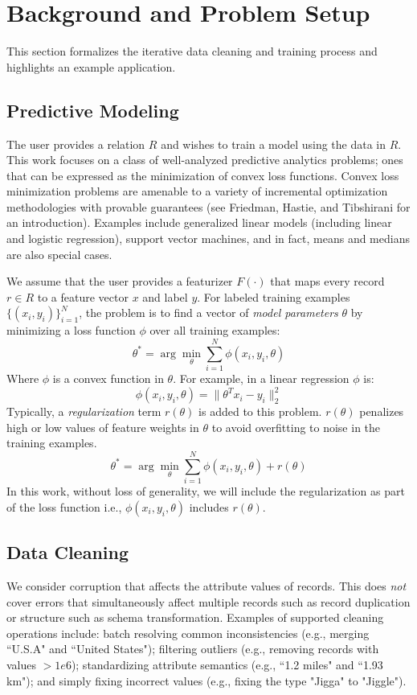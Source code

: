 \section{Background and Problem Setup}\label{background}
This section formalizes the iterative data cleaning and training process and highlights an example application.

\subsection{Predictive Modeling}
The user provides a relation $R$ and wishes to train a model using the data in $R$.
This work focuses on a class of well-analyzed predictive analytics problems; ones that can be expressed as the minimization of convex loss functions.
Convex loss minimization problems are amenable to a variety of incremental optimization methodologies with provable guarantees (see Friedman, Hastie, and Tibshirani \cite{friedman2001elements} for an introduction).
Examples include generalized linear models (including linear and logistic regression), support vector machines, and in fact, means and medians are also special cases. 

We assume that the user provides a featurizer $F(\cdot)$ that maps every record $r \in R$ to a feature vector $x$ and label $y$.
For labeled training examples $\{(x_{i},y_{i})\}_{i=1}^{N}$, the problem is to find a vector of \emph{model parameters} $\theta$ by minimizing a loss function $\phi$ over all training examples:
\[
 \theta^{*}=\arg\min_{\theta}\sum_{i=1}^{N}\phi(x_{i},y_{i},\theta)
\]
Where $\phi$ is a convex function in $\theta$.
For example, in a linear regression $\phi$ is:
\[
\phi(x_{i},y_{i},\theta) = \|\theta^Tx_{i} - y_i \|_2^2
\]
Typically, a \emph{regularization} term $r(\theta)$ is added to this problem.
$r(\theta)$ penalizes high or low values of feature weights in $\theta$ to avoid overfitting to noise in the training examples.
\begin{equation}
 \theta^{*}=\arg\min_{\theta}\sum_{i=1}^{N}\phi(x_{i},y_{i},\theta) + r(\theta)
 \label{ideal}
\end{equation}
In this work, without loss of generality, we will include the regularization as part of the loss function i.e., $\phi(x_{i},y_{i},\theta)$ includes $r(\theta)$.

\subsection{Data Cleaning}
We consider corruption that affects the attribute values of records. This does \emph{not} cover errors that simultaneously affect multiple records such as record duplication or structure such as schema transformation.
Examples of supported cleaning operations include: 
batch resolving common inconsistencies (e.g., merging ``U.S.A" and ``United States");
filtering outliers (e.g., removing records with values $>1e6$);
standardizing attribute semantics (e.g., ``1.2 miles" and ``1.93 km");
and simply fixing incorrect values (e.g., fixing the type "Jigga" to "Jiggle").

